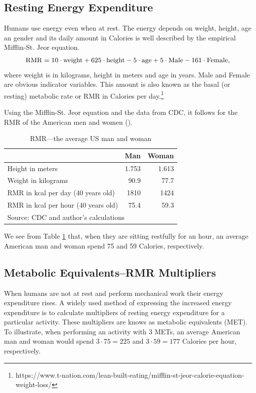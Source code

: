 \documentclass{article}[12pt,letterpaper]
\begin{document}
\subsection{Resting Energy Expenditure}
Humans use energy even when at rest. The energy depends on weight, height, age an gender and its daily amount in Calories is well described by the empirical Mifflin-St. Jeor equation. 
\begin{equation}
  {\rm RMR} = 10 \cdot {\rm weight} + 625\cdot {\rm height} - 5 \cdot {\rm age} + 5\cdot {\rm Male} - 161 \cdot {\rm Female}, 
\end{equation}
where weight is in kilograms, height in meters and age in years. Male and Female are obvious indicator variables. This amount is also known as the basal (or resting) metabolic rate or RMR in Calories per day.\footnote{https://www.t-nation.com/lean-built-eating/mifflin-st-jeor-calorie-equation-weight-loss/}

Using the Mifflin-St. Jeor equation and the data from CDC, it follows for the RMR of the American men and women (\cite{body-measurements}).
\begin{table}[ht]
  \begin{center}
    \caption{RMR---the average US man and woman}
    \label{tab:table_BMR}
    \begin{tabular}{l|r|r}
      \hline
      & Man & Woman \\
      \hline
      Height in meters & 1.753 & 1.613 \\
      Weight in kilograms & 90.9 & 77.7 \\
      RMR in kcal per day (40 years old) & 1810 & 1424 \\
      RMR in kcal per hour (40 years old) & 75.4 & 59.3 \\
    \hline
    \multicolumn{3}{l}{Source: CDC and author's calculations}
    \end{tabular}
  \end{center}
\end{table}
We see from Table \ref{tab:table_BMR} that, when they are sitting restfully for an hour, an average American man and woman spend 75 and 59 Calories, respectively.

\subsection{Metabolic Equivalents--RMR Multipliers}
When humans are not at rest and perform mechanical work their energy expenditure rises. A widely used method of expressing the increased energy expenditure is to calculate multipliers of resting energy expenditure for a particular activity. These multipliers are knows as metabolic equivalents (MET). To illustrate, when performing an activity with 3 METs, an average American man and woman would spend $3 \cdot 75 =225$ and $3 \cdot 59 = 177$ Calories per hour, respectively.
\end{document}
